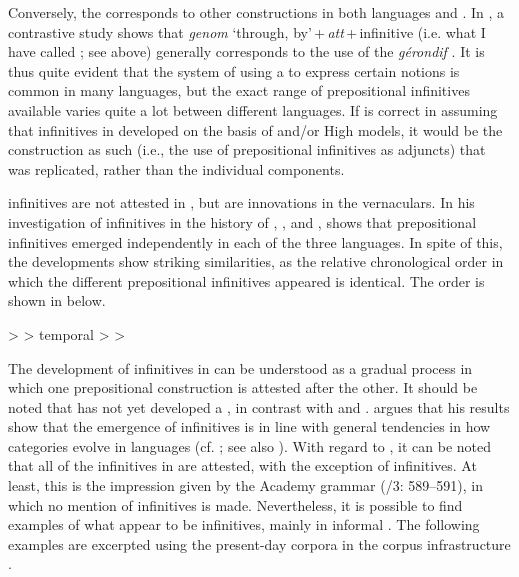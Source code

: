 \documentclass[output=paper]{langscibook}
\begin{document}
Conversely, the   corresponds to other constructions in both  languages and . In , a contrastive study shows that \textit{genom} ‘through, by’\,+\,\textit{att}\,+\,infinitive (i.e. what I have called ; see  above) generally corresponds to the use of the \textit{gérondif} \citep[128]{Hellqvist2015}. It is thus quite evident that the system of using a  to express certain  notions is common in many languages, but the exact range of prepositional infinitives available varies quite a lot between different languages. If \citet{Holm1967} is correct in assuming that  infinitives in  developed on the basis of  and/or High  models, it would be the construction as such (i.e., the use of prepositional infinitives as  adjuncts) that was replicated, rather than the individual components. 



 infinitives are not attested in , but are innovations in the vernaculars. In his investigation of  infinitives in the history of , , and , \citet{Schulte2007Prepositional,Schulte2007What} shows that prepositional infinitives emerged independently in each of the three languages. In spite of this, the developments show striking similarities, as the relative chronological order in which the different prepositional infinitives appeared is identical. The order is shown in  below. 


\ea \label{ex:kalm:6}
 >  > temporal >  > 
\z

The development of  infinitives in  can be understood as a gradual process in which one prepositional construction is attested after the other. It should be noted that  has not yet developed a , in contrast with  and . \citet{Schulte2007Prepositional} argues that his results show that the emergence of  infinitives is in line with general tendencies in how  categories evolve in languages (cf. \citealt{Cristofaro2005}; see also ). With regard to , it can be noted that all of the  infinitives in  are attested, with the exception of  infinitives. At least, this is the impression given by the  Academy grammar (\citealt{TelemanEtAl1999}/3: 589–591), in which no mention of  infinitives is made. Nevertheless, it is possible to find examples of what appear to be  infinitives, mainly in informal . The following examples are excerpted using the present-day  corpora in the corpus infrastructure  \citep{BorinEtAl2012}. 
\end{document}

